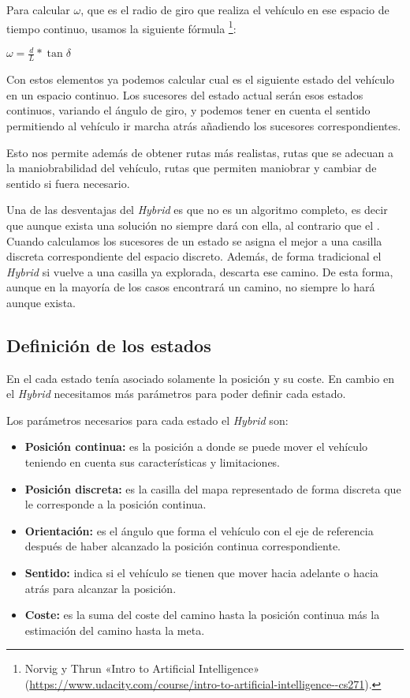 Para calcular $\omega$, que es el radio de giro que realiza el vehículo en ese espacio de tiempo continuo, usamos la siguiente fórmula
\footnote{Norvig y Thrun «Intro to Artificial Intelligence» (\url{https://www.udacity.com/course/intro-to-artificial-intelligence--cs271}).}:
\begin{center}
$\omega = \displaystyle \frac{d}{L} * \tan \delta  $
\end{center}

Con estos elementos ya podemos calcular cual es el siguiente estado del vehículo en un espacio continuo. Los sucesores del estado actual serán esos estados continuos, variando el ángulo de giro, y podemos tener en cuenta el sentido permitiendo al vehículo ir marcha atrás añadiendo los sucesores correspondientes.

Esto nos permite además de obtener rutas más realistas, rutas que se adecuan a la maniobrabilidad del vehículo,  rutas que permiten maniobrar y cambiar de sentido si fuera necesario.

Una de las desventajas del \textit{Hybrid \Astar} es que no es un algoritmo completo, es decir que aunque exista una solución no siempre dará con ella, al contrario que el \Astar. Cuando calculamos los sucesores de un estado se asigna el mejor a una casilla discreta correspondiente del espacio discreto. Además, de forma tradicional el \textit{Hybrid \Astar} si vuelve a una casilla ya explorada, descarta ese camino. De esta forma, aunque en la mayoría de los casos encontrará un camino, no siempre lo hará aunque exista.

\subsection{Definición de los estados}
En el \Astar cada estado tenía asociado solamente la posición y su coste. En cambio en el \textit{Hybrid \Astar} necesitamos más parámetros para poder definir cada estado.

Los parámetros necesarios para cada estado el \textit{Hybrid \Astar} son:
\begin{itemize}
\item \textbf{Posición continua:} es la posición a donde se puede mover el vehículo teniendo en cuenta sus características y limitaciones.
\item \textbf{Posición discreta:} es la casilla del mapa representado de forma discreta que le corresponde a la posición continua.
\item \textbf{Orientación:} es el ángulo que forma el vehículo con el eje de referencia después de haber alcanzado la posición continua correspondiente.
\item \textbf{Sentido:} indica si el vehículo se tienen que mover hacia adelante o hacia atrás para alcanzar la posición.
\item \textbf{Coste:} es la suma del coste del camino hasta la posición continua más la estimación del camino hasta la meta.
\end{itemize}

